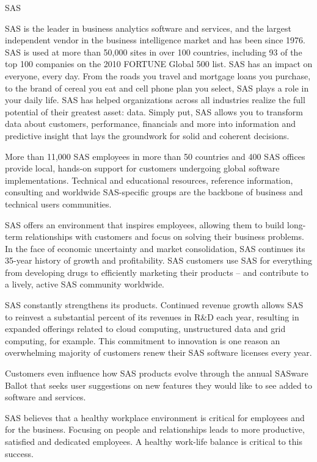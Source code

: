 
                                                SAS

SAS is the leader in business analytics software and services, and the largest independent vendor in the business intelligence market and has been since 1976. SAS is used at more than 50,000 sites in over 100 countries, including 93 of the top 100 companies on the 2010 FORTUNE Global 500  list. SAS has an impact on everyone, every day. From the roads you travel and mortgage loans you purchase, to the brand of cereal you eat and cell phone plan you select, SAS plays a role in your daily life. SAS has helped organizations across all industries realize the full potential of their greatest asset: data. Simply put, SAS allows you to transform data about customers, performance, financials and more into information and predictive insight that lays the groundwork for solid and coherent decisions. 

More than 11,000 SAS employees in more than 50 countries and 400 SAS offices provide local, hands-on support for customers undergoing global software implementations. Technical and educational resources, reference information, consulting and worldwide SAS-specific groups are the backbone of business and technical users communities.

SAS offers an environment that inspires employees, allowing them to build long-term relationships with customers and focus on solving their business problems. In the face of economic uncertainty and market consolidation, SAS continues its 35-year history of growth and profitability. SAS customers use SAS for everything from developing drugs to efficiently marketing their products – and contribute to a lively, active SAS community worldwide. 


SAS constantly strengthens its products. Continued revenue growth allows SAS to reinvest a substantial percent of its revenues in R&D each year, resulting in expanded offerings related to cloud computing, unstructured data and grid computing, for example. This commitment to innovation is one reason an overwhelming majority of customers renew their SAS software licenses every year.

Customers even influence how SAS products evolve through the annual SASware Ballot that seeks user suggestions on new features they would like to see added to software and services.

SAS believes that a healthy workplace environment is critical for employees and for the business. Focusing on people and relationships leads to more productive, satisfied and dedicated employees. A healthy work-life balance is critical to this success.

